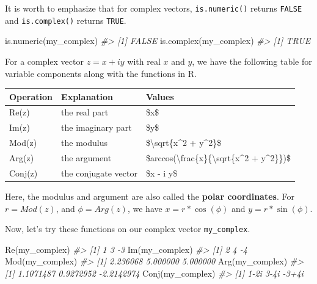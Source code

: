 \documentclass[
]{book}
\newenvironment{Shaded}{\begin{snugshade}}{\end{snugshade}}
\newcommand{\CommentTok}[1]{\textcolor[rgb]{0.56,0.35,0.01}{\textit{#1}}}
\newcommand{\FunctionTok}[1]{\textcolor[rgb]{0.00,0.00,0.00}{#1}}
\newcommand{\NormalTok}[1]{#1}
\begin{document}
It is worth to emphasize that for complex vectors, \texttt{is.numeric()} returns \texttt{FALSE} and \texttt{is.complex()} returns \texttt{TRUE}.

\begin{Shaded}
\begin{Highlighting}[]
\FunctionTok{is.numeric}\NormalTok{(my\_complex)}
\CommentTok{\#\textgreater{} [1] FALSE}
\FunctionTok{is.complex}\NormalTok{(my\_complex)}
\CommentTok{\#\textgreater{} [1] TRUE}
\end{Highlighting}
\end{Shaded}

For a complex vector \(z = x + i y\) with real \(x\) and \(y\), we have the following table for variable components along with the functions in R.

\begin{tabular}{l|l|l}
\hline
Operation & Explanation & Values\\
\hline
Re(z) & the real part & \$x\$\\
\hline
Im(z) & the imaginary part & \$y\$\\
\hline
Mod(z) & the modulus & \$\textbackslash{}sqrt\{x\textasciicircum{}2 + y\textasciicircum{}2\}\$\\
\hline
Arg(z) & the argument & \$arccos(\textbackslash{}frac\{x\}\{\textbackslash{}sqrt\{x\textasciicircum{}2 + y\textasciicircum{}2\}\})\$\\
\hline
Conj(z) & the conjugate vector & \$x - i y\$\\
\hline
\end{tabular}

Here, the modulus and argument are also called the \textbf{polar coordinates}. For \(r = Mod(z)\), and \(\phi = Arg(z)\), we have \(x = r*\cos(\phi)\) and \(y = r*\sin(\phi)\).

Now, let's try these functions on our complex vector \texttt{my\_complex}.

\begin{Shaded}
\begin{Highlighting}[]
\FunctionTok{Re}\NormalTok{(my\_complex)}
\CommentTok{\#\textgreater{} [1]  1  3 {-}3}
\FunctionTok{Im}\NormalTok{(my\_complex)}
\CommentTok{\#\textgreater{} [1]  2  4 {-}4}
\FunctionTok{Mod}\NormalTok{(my\_complex)}
\CommentTok{\#\textgreater{} [1] 2.236068 5.000000 5.000000}
\FunctionTok{Arg}\NormalTok{(my\_complex)}
\CommentTok{\#\textgreater{} [1]  1.1071487  0.9272952 {-}2.2142974}
\FunctionTok{Conj}\NormalTok{(my\_complex)}
\CommentTok{\#\textgreater{} [1]  1{-}2i  3{-}4i {-}3+4i}
\end{Highlighting}
\end{Shaded}
\end{document}
